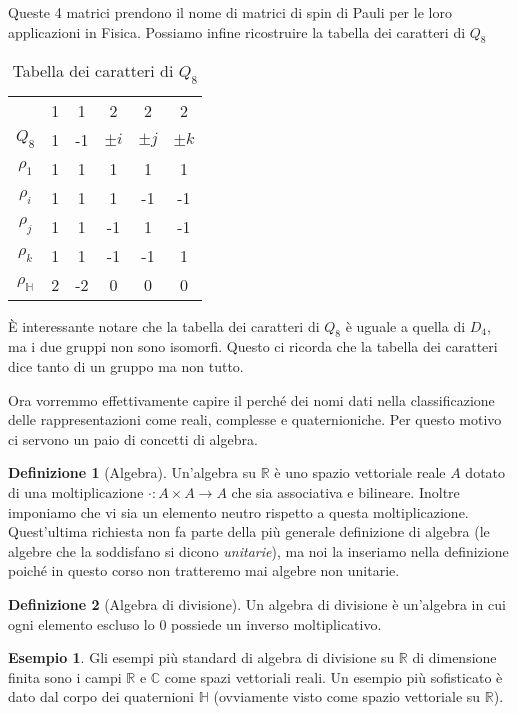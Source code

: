 \documentclass[11pt]{article}
\theoremstyle{plain}
\theoremstyle{definition}
\newtheorem{defn}{Definizione}[section]
\newtheorem{exmp}{Esempio}[section]
\theoremstyle{remark}
\newcommand{\C}{\mathbb{C}}
\newcommand{\R}{\mathbb{R}}
\newcommand{\HH}{\mathbb{H}}
\begin{document}
Queste 4 matrici prendono il nome di matrici di spin di Pauli per le loro applicazioni in Fisica. Possiamo infine ricostruire la tabella dei caratteri di $Q_8$

\begin{table}[!ht]
\centering
\begin{tabular}{|c|c|c|c|c|c|}
\hline
& 1 & 1 & 2 & 2 & 2 \\
$Q_8$ & 1 & -1 & $\pm i$ & $\pm j$ & $\pm k$ \\
\hline
$\rho_1$ & 1 & 1 & 1 & 1 & 1 \\
\hline
$\rho_i$ & 1 & 1 & 1 & -1 & -1 \\
\hline
$\rho_j$ & 1 & 1 & -1 & 1 & -1 \\
\hline
$\rho_k$ & 1 & 1 & -1 & -1 & 1 \\
\hline
$\rho_\HH$ & 2 & -2 & 0 & 0 & 0 \\
\hline
\end{tabular}
\caption{Tabella dei caratteri di $Q_8$}
\label{tab: caratteri q8}
\end{table}


\`E interessante notare che la tabella dei caratteri di $Q_8$ è uguale a quella di $D_4$, ma i due gruppi non sono isomorfi. Questo ci ricorda che la tabella dei caratteri dice tanto di un gruppo ma non tutto.



Ora vorremmo effettivamente capire il perché dei nomi dati nella classificazione delle rappresentazioni come reali, complesse e quaternioniche.
Per questo motivo ci servono un paio di concetti di algebra.


\begin{defn}[Algebra]
Un'algebra su $\R$ è uno spazio vettoriale reale $A$ dotato di una moltiplicazione $\cdot : A \times A \to A$ che sia associativa e bilineare.
Inoltre imponiamo che vi sia un elemento neutro rispetto a questa moltiplicazione. Quest'ultima richiesta non fa parte della
più generale definizione di algebra (le algebre che la soddisfano si dicono \emph{unitarie}), ma noi la inseriamo nella definizione
poiché in questo corso non tratteremo mai algebre non unitarie.
\end{defn}


\begin{defn}[Algebra di divisione]
Un algebra di divisione è un'algebra in cui ogni elemento escluso lo $0$ possiede un inverso moltiplicativo.
\end{defn}

\begin{exmp}
Gli esempi più standard di algebra di divisione su $\R$ di dimensione finita sono i campi $\R$ e $\C$ come spazi vettoriali reali.
Un esempio più sofisticato è dato dal corpo dei quaternioni $\HH$ (ovviamente visto come spazio vettoriale su $\R$).
\end{exmp}
\end{document}
